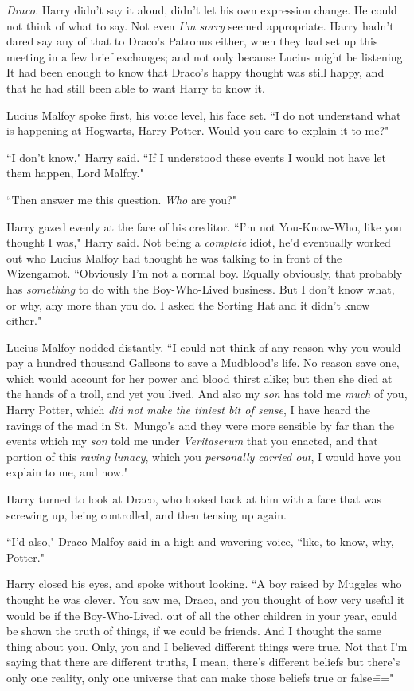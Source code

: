 \emph{Draco.} Harry didn't say it aloud, didn't let his own expression change. He could not think of what to say. Not even \emph{I'm sorry} seemed appropriate. Harry hadn't dared say any of that to Draco's Patronus either, when they had set up this meeting in a few brief exchanges; and not only because Lucius might be listening. It had been enough to know that Draco's happy thought was still happy, and that he had still been able to want Harry to know it.

Lucius Malfoy spoke first, his voice level, his face set. ``I do not understand what is happening at Hogwarts, Harry Potter. Would you care to explain it to me?"

``I don't know," Harry said. ``If I understood these events I would not have let them happen, Lord Malfoy."

``Then answer me this question. \emph{Who} are you?"

Harry gazed evenly at the face of his creditor. ``I'm not You-Know-Who, like you thought I was," Harry said. Not being a \emph{complete} idiot, he'd eventually worked out who Lucius Malfoy had thought he was talking to in front of the Wizengamot. ``Obviously I'm not a normal boy. Equally obviously, that probably has \emph{something} to do with the Boy-Who-Lived business. But I don't know what, or why, any more than you do. I asked the Sorting Hat and it didn't know either."

Lucius Malfoy nodded distantly. ``I could not think of any reason why you would pay a hundred thousand Galleons to save a Mudblood's life. No reason save one, which would account for her power and blood thirst alike; but then she died at the hands of a troll, and yet you lived. And also my \emph{son} has told me \emph{much} of you, Harry Potter, which \emph{did not make the tiniest bit of sense}, I have heard the ravings of the mad in St.~Mungo's and they were more sensible by far than the events which my \emph{son} told me under \emph{Veritaserum} that you enacted, and that portion of this \emph{raving lunacy}, which you \emph{personally carried out}, I would have you explain to me, and now."

Harry turned to look at Draco, who looked back at him with a face that was screwing up, being controlled, and then tensing up again.

``I'd also," Draco Malfoy said in a high and wavering voice, ``like, to know, why, Potter."

Harry closed his eyes, and spoke without looking. ``A boy raised by Muggles who thought he was clever. You saw me, Draco, and you thought of how very useful it would be if the Boy-Who-Lived, out of all the other children in your year, could be shown the truth of things, if we could be friends. And I thought the same thing about you. Only, you and I believed different things were true. Not that I'm saying that there are different truths, I mean, there's different beliefs but there's only one reality, only one universe that can make those beliefs true or false\==="

